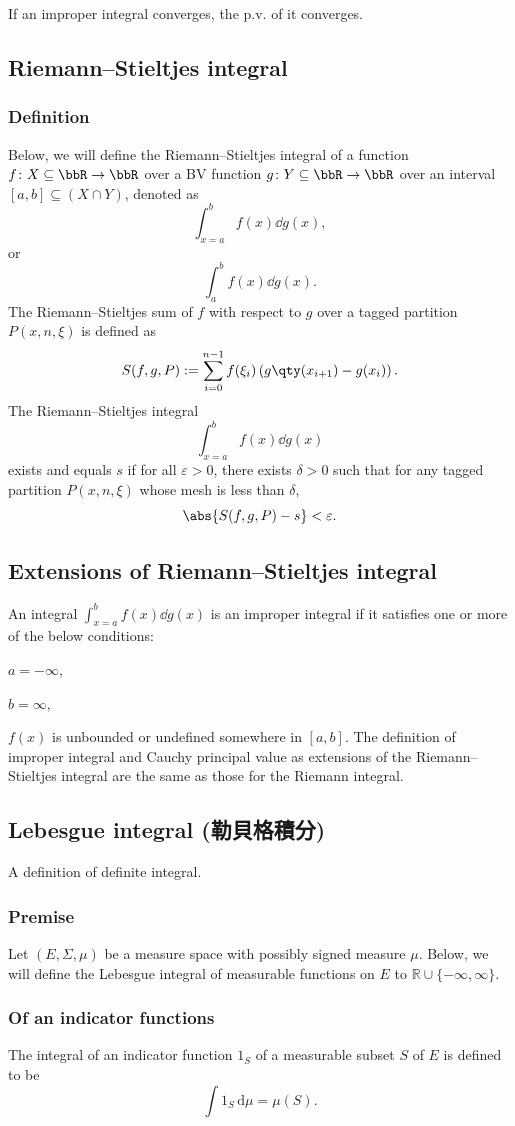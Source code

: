 If an improper integral converges, the p.v. of it converges.
\subsection{Riemann–Stieltjes integral}
\subsubsection{Definition}
Below, we will define the Riemann–Stieltjes integral of a function $f\colon X\subseteq\bbR\to\bbR$ over a BV function $g\colon Y\subseteq\bbR\to\bbR$ over an interval $[a,b]\subseteq (X\cap Y)$, denoted as
\[\int_{x=a}^bf(x)\dd{g(x)},\]
or
\[\int_a^bf(x)\dd{g(x)}.\]
The Riemann–Stieltjes sum of $f$ with respect to $g$ over a tagged partition $P(x,n,\xi)$ is defined as
\[S(f,g,P):=\sum_{i=0}^{n-1}f(\xi_i)\left(g\qty(x_{i+1})-g(x_i)\right).\]
The Riemann–Stieltjes integral
\[\int_{x=a}^bf(x)\dd{g(x)}\]
exists and equals $s$ if for all $\varepsilon > 0$, there exists $\delta > 0$ such that for any tagged partition $P(x,n,\xi)$ whose mesh is less than $\delta$,
\[\abs{S(f,g,P)-s}<\varepsilon.\]
\subsection{Extensions of Riemann–Stieltjes integral}
An integral $\int_{x=a}^bf(x)\dd{g(x)}$ is an improper integral if it satisfies one or more of the below conditions:
\ben
\item $a=-\infty$,
\item $b=\infty$,
\item $f(x)$ is unbounded or undefined somewhere in $[a,b]$.
\een
The definition of improper integral and Cauchy principal value as extensions of the Riemann–Stieltjes integral are the same as those for the Riemann integral.
\subsection{Lebesgue integral (勒貝格積分)}
A definition of definite integral.
\subsubsection{Premise}
Let $(E,\Sigma,\mu)$ be a measure space with possibly signed measure $\mu$. Below, we will define the Lebesgue integral of measurable functions on $E$ to $\mathbb{R}\cup\{-\infty,\infty\}$.
\subsubsection{Of an indicator functions}
The integral of an indicator function $1_S$ of a measurable subset $S$ of $E$ is defined to be
\[\int 1_{S}\,\mathrm{d}{\mu} =\mu (S).\]

